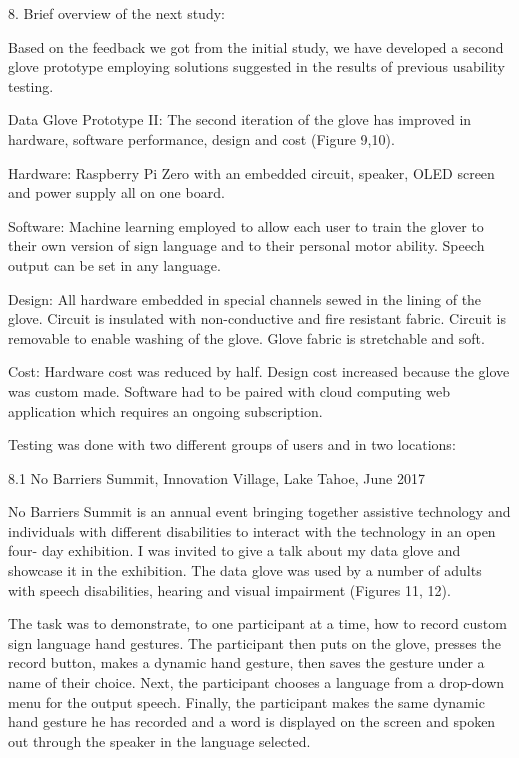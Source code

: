 8. Brief overview of the next study:

Based on the feedback we got from the initial study, we have developed a second glove prototype employing solutions suggested in the results of previous usability testing. 

Data Glove Prototype II:
The second iteration of the glove has improved in hardware, software performance, design and cost (Figure 9,10). 

Hardware: Raspberry Pi Zero with an embedded circuit, speaker, OLED screen and power supply all on one board.

Software: Machine learning employed to allow each user to train the glover to their own version of sign language and to their personal motor ability. Speech output can be set in any language. 

Design: All hardware embedded in special channels sewed in the lining of the glove.  Circuit is insulated with non-conductive and fire resistant fabric.  Circuit is removable to enable washing of the glove. Glove fabric is stretchable and soft.  

Cost: Hardware cost was reduced by half. Design cost increased because the glove was custom made. Software had to be paired with cloud computing web application which requires an ongoing subscription. 

Testing was done with two different groups of users and in two locations:

8.1 No Barriers Summit, Innovation Village, Lake Tahoe, June 2017

No Barriers Summit is an annual event bringing together assistive technology and individuals with different disabilities to interact with the technology in an open four- day exhibition. I was invited to give a talk about my data glove and showcase it in the exhibition. The data glove was used by a number of adults with speech disabilities, hearing and visual impairment (Figures 11, 12).  

The task was to demonstrate, to one participant at a time, how to record custom sign language hand gestures. The participant then puts on the glove, presses the record button, makes a dynamic hand gesture, then saves the gesture under a name of their choice. Next, the participant chooses a language from a drop-down menu for the output speech. Finally, the participant makes the same dynamic hand gesture he has recorded and a word is displayed on the screen and spoken out through the speaker in the language selected. 

